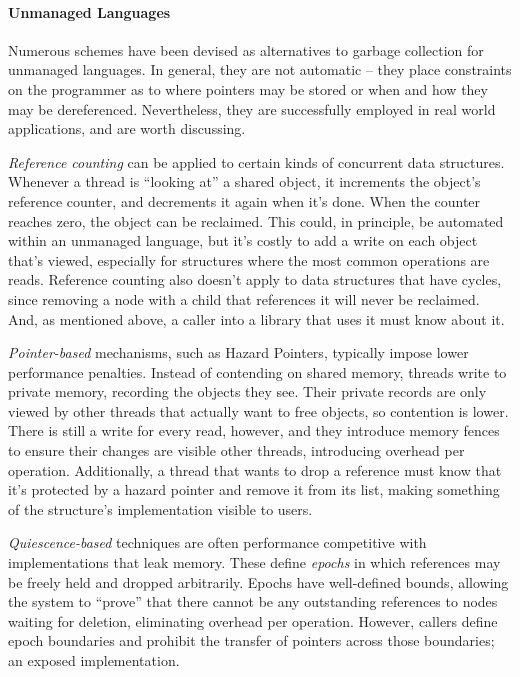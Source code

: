 \paragraph{Unmanaged Languages} Numerous schemes have been devised as alternatives to garbage collection for unmanaged languages.  In general, they are not automatic -- they place constraints on the programmer as to where pointers may be stored or when and how they may be dereferenced.  Nevertheless, they are successfully employed in real world applications, and are worth discussing.

\textit{Reference counting} can be applied to certain kinds of concurrent data structures\cite{DMMS, GPST09}.  Whenever a thread is ``looking at'' a shared object, it increments the object's reference counter, and decrements it again when it's done.  When the counter reaches zero, the object can be reclaimed.  This could, in principle, be automated within an unmanaged language, but it's costly to add a write on each object that's viewed, especially for structures where the most common operations are reads.  Reference counting also doesn't apply to data structures that have cycles, since removing a node with a child that references it will never be reclaimed.  And, as mentioned above, a caller into a library that uses it must know about it.

\textit{Pointer-based} mechanisms, such as Hazard Pointers\cite{HP, DTA}, typically impose lower performance penalties.  Instead of contending on shared memory, threads write to private memory, recording the objects they see.  Their private records are only viewed by other threads that actually want to free objects, so contention is lower.  There is still a write for every read, however, and they introduce memory fences to ensure their changes are visible other threads, introducing overhead per operation.  Additionally, a thread that wants to drop a reference must know that it's protected by a hazard pointer and remove it from its list, making something of the structure's implementation visible to users.

\textit{Quiescence-based} techniques\cite{FraserH07, Harris, Hart} are often performance competitive with implementations that leak memory.  These define \textit{epochs} in which references may be freely held and dropped arbitrarily.  Epochs have well-defined bounds, allowing the system to ``prove'' that there cannot be any outstanding references to nodes waiting for deletion, eliminating overhead per operation.  However, callers define epoch boundaries and prohibit the transfer of pointers across those boundaries; an exposed implementation.


